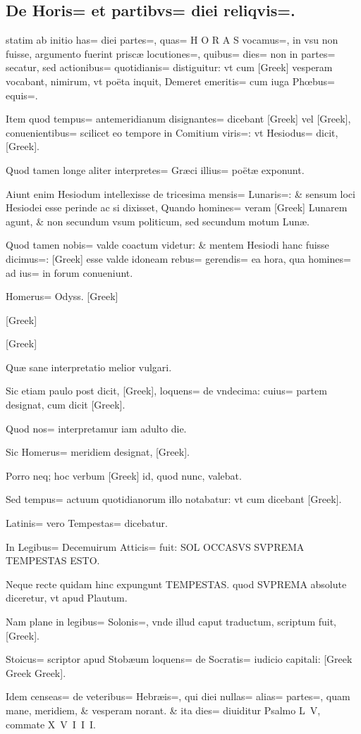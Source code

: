\subsection{De Horis= et partibvs= diei reliqvis=.}
\setcounter{parcount}{0}
\begin{parnumbers}

 statim ab initio has= diei partes=, quas= H O R A S vocamus=, in vsu non fuisse, argumento fuerint priscæ locutiones=,  quibus= dies= non in partes= secatur, sed actionibus= quotidianis= distiguitur: vt cum [Greek] vesperam vocabant, nimirum, vt poëta inquit, Demeret emeritis= cum iuga Phœbus= equis=.

Item quod tempus= antemeridianum disignantes= dicebant [Greek] vel [Greek], conuenientibus= scilicet eo tempore in Comitium viris=: vt Hesiodus= dicit, [Greek].

Quod tamen longe aliter interpretes= Græci illius= poëtæ exponunt.

Aiunt enim Hesiodum intellexisse de tricesima mensis= Lunaris=: \& sensum loci Hesiodei esse perinde ac si dixisset, Quando homines= veram [Greek] Lunarem agunt, \& non secundum vsum politicum, sed secundum motum Lunæ.

Quod  tamen nobis= valde coactum videtur: \& mentem Hesiodi hanc fuisse dicimus=: [Greek] esse valde idoneam rebus= gerendis= ea hora, qua homines= ad ius= in forum conueniunt.

Homerus= Odyss. [Greek]

[Greek]

[Greek]

Quæ sane interpretatio melior vulgari.

Sic etiam paulo post dicit, [Greek], loquens= de vndecima: cuius= partem designat, cum dicit [Greek].

Quod nos= interpretamur iam adulto die.

Sic Homerus= meridiem designat, [Greek].

Porro neq; hoc verbum [Greek] id, quod nunc, valebat.

Sed tempus= actuum quotidianorum illo notabatur: vt cum dicebant [Greek].

 Latinis= vero Tempestas= dicebatur.

In Legibus= Decemuirum Atticis= fuit: SOL OCCASVS SVPREMA TEMPESTAS ESTO.

Neque recte quidam hinc expungunt TEMPESTAS. quod SVPREMA absolute diceretur, vt apud Plautum.

Nam plane in legibus= Solonis=, vnde illud caput traductum, scriptum fuit, [Greek].

Stoicus= scriptor apud Stobæum loquens= de Socratis= iudicio capitali: [Greek Greek Greek].

Idem censeas= de veteribus= Hebræis=,  qui diei nullas= alias= partes=, quam mane, meridiem, \& vesperam norant. \& ita dies= diuiditur Psalmo L V, commate X V I I I.

\end{parnumbers}
